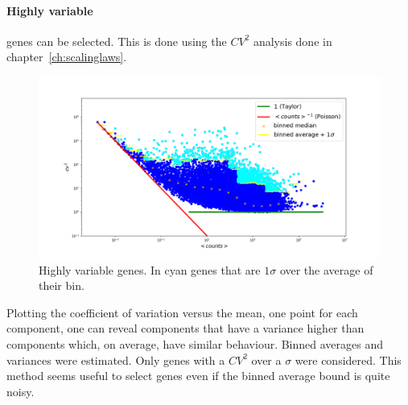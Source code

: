 \paragraph{Highly variable} genes can be selected. This is done using the $CV^2$ analysis done in chapter~\ref{ch:scalinglaws}.
\begin{figure}[htb!]
    \centering
    \includegraphics[width=0.8\linewidth]{pictures/topic/cvmean_oversigma.png}
    \caption{Highly variable genes. In \textcolor{pythoncyan}{cyan} genes that are $1 \sigma$ over the average of their bin.}
    \label{fig:topic/cvmean_oversigma}
\end{figure}
Plotting the coefficient of variation versus the mean, one point for each component, one can reveal components that have a variance higher than components which, on average, have similar behaviour. Binned averages and variances were estimated. Only genes with a $CV^2$ over a $\sigma$ were considered. This method seems useful to select genes even if the binned average bound is quite noisy.

\FloatBarrier
